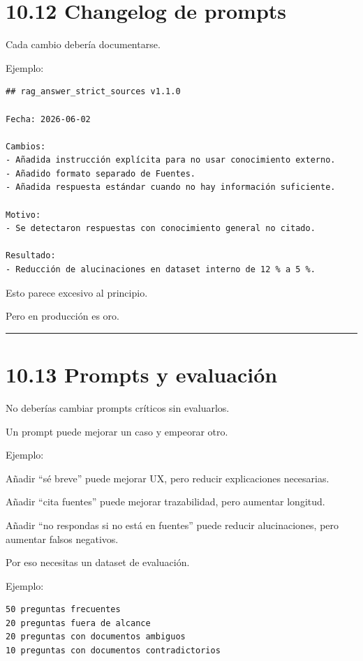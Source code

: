 \section{10.12 Changelog de prompts}\label{changelog-de-prompts}

Cada cambio debería documentarse.

Ejemplo:

\begin{lstlisting}
## rag_answer_strict_sources v1.1.0

Fecha: 2026-06-02

Cambios:
- Añadida instrucción explícita para no usar conocimiento externo.
- Añadido formato separado de Fuentes.
- Añadida respuesta estándar cuando no hay información suficiente.

Motivo:
- Se detectaron respuestas con conocimiento general no citado.

Resultado:
- Reducción de alucinaciones en dataset interno de 12 % a 5 %.
\end{lstlisting}

Esto parece excesivo al principio.

Pero en producción es oro.

\begin{center}\rule{0.5\linewidth}{0.5pt}\end{center}

\section{10.13 Prompts y evaluación}\label{prompts-y-evaluaciuxf3n}

No deberías cambiar prompts críticos sin evaluarlos.

Un prompt puede mejorar un caso y empeorar otro.

Ejemplo:

Añadir ``sé breve'' puede mejorar UX, pero reducir explicaciones
necesarias.

Añadir ``cita fuentes'' puede mejorar trazabilidad, pero aumentar
longitud.

Añadir ``no respondas si no está en fuentes'' puede reducir
alucinaciones, pero aumentar falsos negativos.

Por eso necesitas un dataset de evaluación.

Ejemplo:

\begin{lstlisting}
50 preguntas frecuentes
20 preguntas fuera de alcance
20 preguntas con documentos ambiguos
10 preguntas con documentos contradictorios
\end{lstlisting}

